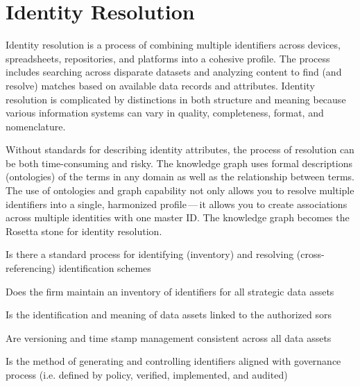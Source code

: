 \section{Identity Resolution}\label{sec:ekg-mm-b-2-1} %

Identity resolution is a process of combining multiple identifiers across devices, spreadsheets, repositories, and
platforms into a cohesive profile.
The process includes searching across disparate datasets and analyzing content to find (and resolve) matches based
on available data records and attributes.
Identity resolution is complicated by distinctions in both structure and meaning because various information systems
can vary in quality, completeness, format, and nomenclature.

\ekgmmContextSection

Without standards for describing identity attributes, the process of resolution can be both time-consuming and risky.
The knowledge graph uses formal descriptions (ontologies) of the terms in any domain as well as the relationship
between terms.
The use of ontologies and graph capability not only allows you to resolve multiple identifiers into a single,
harmonized profile\,---\,it allows you to create associations across multiple identities with one master ID.
The knowledge graph becomes the Rosetta stone for identity resolution.

\kgmmcorequestionssection

\begin{core-questions}

  \item [\thesection.1] Is there a standard process for identifying (inventory) and resolving (cross-referencing)
                        identification schemes
  \item [\thesection.2] Does the firm maintain an inventory of identifiers for all strategic data assets
  \item [\thesection.3] Is the identification and meaning of data assets linked to the authorized \glspl{sor}
  \item [\thesection.4] Are versioning and time stamp management consistent across all data assets
  \item [\thesection.5] Is the method of generating and controlling identifiers aligned with governance process
                        (i.e. defined by policy, verified, implemented, and audited)

\end{core-questions}

